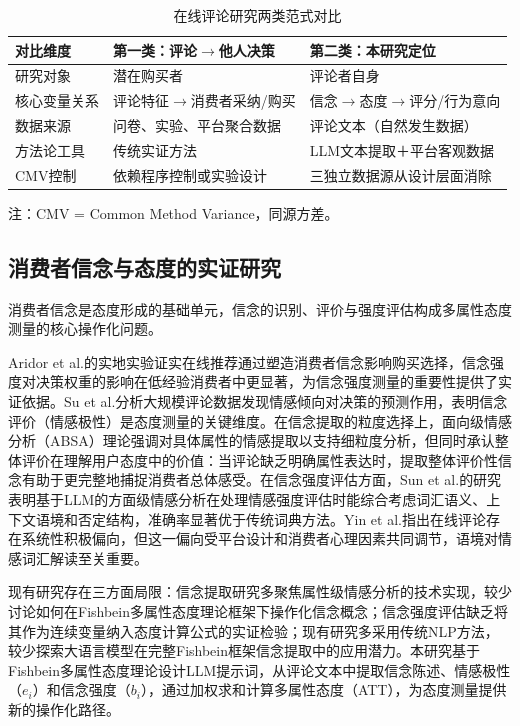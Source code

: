 \begin{table}[htbp]
\centering
\caption{在线评论研究两类范式对比}
\label{tab:two_paradigms}
\begin{threeparttable}
\begin{tabular}{@{}lll@{}}
\toprule
对比维度 & 第一类：评论$\to$他人决策 & 第二类：本研究定位 \\
\midrule
研究对象 & 潜在购买者 & 评论者自身 \\
核心变量关系 & 评论特征$\to$消费者采纳/购买 & 信念$\to$态度$\to$评分/行为意向 \\
数据来源 & 问卷、实验、平台聚合数据 & 评论文本（自然发生数据） \\
方法论工具 & 传统实证方法 & LLM文本提取＋平台客观数据 \\
CMV控制 & 依赖程序控制或实验设计 & 三独立数据源从设计层面消除 \\
\bottomrule
\end{tabular}
\begin{tablenotes}
\small
\item 注：CMV = Common Method Variance，同源方差。
\end{tablenotes}
\end{threeparttable}
\end{table}

\subsection{消费者信念与态度的实证研究}

消费者信念是态度形成的基础单元，信念的识别、评价与强度评估构成多属性态度测量的核心操作化问题。

Aridor et al.\cite{aridor2022}的实地实验证实在线推荐通过塑造消费者信念影响购买选择，信念强度对决策权重的影响在低经验消费者中更显著，为信念强度测量的重要性提供了实证依据。Su et al.\cite{su2022}分析大规模评论数据发现情感倾向对决策的预测作用，表明信念评价（情感极性）是态度测量的关键维度。在信念提取的粒度选择上，面向级情感分析（ABSA）理论强调对具体属性的情感提取以支持细粒度分析\cite{zhang2022absa}，但同时承认整体评价在理解用户态度中的价值：当评论缺乏明确属性表达时，提取整体评价性信念有助于更完整地捕捉消费者总体感受。在信念强度评估方面，Sun et al.\cite{sun2023}的研究表明基于LLM的方面级情感分析在处理情感强度评估时能综合考虑词汇语义、上下文语境和否定结构，准确率显著优于传统词典方法。Yin et al.\cite{yin2023}指出在线评论存在系统性积极偏向，但这一偏向受平台设计和消费者心理因素共同调节，语境对情感词汇解读至关重要。

现有研究存在三方面局限：信念提取研究多聚焦属性级情感分析的技术实现，较少讨论如何在Fishbein多属性态度理论框架下操作化信念概念；信念强度评估缺乏将其作为连续变量纳入态度计算公式的实证检验；现有研究多采用传统NLP方法，较少探索大语言模型在完整Fishbein框架信念提取中的应用潜力。本研究基于Fishbein多属性态度理论设计LLM提示词，从评论文本中提取信念陈述、情感极性（$e_i$）和信念强度（$b_i$），通过加权求和计算多属性态度（ATT），为态度测量提供新的操作化路径。

